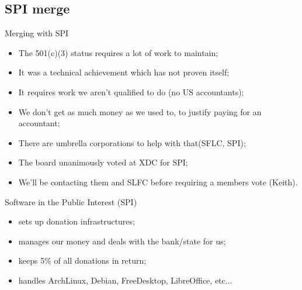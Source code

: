 \documentclass{beamer}
\begin{document}
		\subsection{SPI merge}
		\begin{frame}
			\begin{block}{Merging with SPI}
				\begin{itemize}
					\item The 501(c)(3) status requires a lot of work to maintain;
					\item It was a technical achievement which has not proven itself;
					\item It requires work we aren't qualified to do (no US accountants);
					\item We don't get as much money as we used to, to justify paying for an accountant;
					\item There are umbrella corporations to help with that(SFLC, SPI);
					\item The board unanimously voted at XDC for SPI;
					\item We'll be contacting them and SLFC before requiring a members vote (Keith).
				\end{itemize}
			\end{block}
		\end{frame}

		\begin{frame}
			\begin{block}{Software in the Public Interest (SPI)}
				\begin{itemize}
					\item sets up donation infrastructures;
					\item manages our money and deals with the bank/state for us;
					\item keeps 5\% of all donations in return;
					\item handles ArchLinux, Debian, FreeDesktop, LibreOffice, etc...
				\end{itemize}
			\end{block}
		\end{frame}
\end{document}

